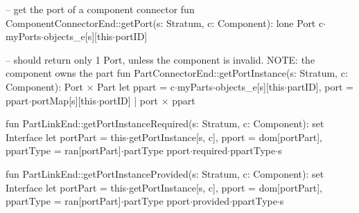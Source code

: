 -- get the port of a component connector
fun ComponentConnectorEnd::getPort(s: Stratum, c: Component): lone Port
{
    c$\cdot$myPorts$\cdot$objects_e[s][this$\cdot$portID]
}

-- should return only 1 Port, unless the component is invalid. NOTE: the component owns the part
fun PartConnectorEnd::getPortInstance(s: Stratum, c: Component): Port$\,\times\,$Part
{
    let
        ppart = c$\cdot$myParts$\cdot$objects_e[s][this$\cdot$partID],
        port = ppart$\cdot$portMap[s][this$\cdot$portID] |
    port$\,\times\,$ppart
}

fun PartLinkEnd::getPortInstanceRequired(s: Stratum, c: Component): set Interface
{
  let portPart = this$\cdot$getPortInstance[s, c],
    pport = dom[portPart],
    ppartType = ran[portPart]$\cdot$partType
  {
    pport$\cdot$required$\cdot$ppartType$\cdot$s
  }
}

fun PartLinkEnd::getPortInstanceProvided(s: Stratum, c: Component): set Interface
{
  let portPart = this$\cdot$getPortInstance[s, c],
    pport = dom[portPart],
    ppartType = ran[portPart]$\cdot$partType
  {
    pport$\cdot$provided$\cdot$ppartType$\cdot$s
  }
}



